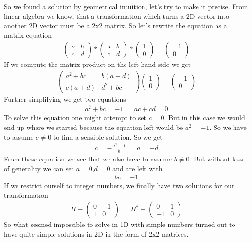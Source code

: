 So we found a solution by geometrical intuition, let's try to make it
precise. From linear algebra we know, that a transformation which turns
a 2D vector into another 2D vector must be a 2x2 matrix. So let's
rewrite the equation as a matrix equation 
\begin{align}
\begin{pmatrix} a & b \\ c & d \end{pmatrix} * \begin{pmatrix} a & b \\ c & d \end{pmatrix} * \begin{pmatrix} 1 \\ 0 \end{pmatrix} = \begin{pmatrix} -1 \\ 0 \end{pmatrix} 
\end{align} 
If we compute the matrix product on the left hand side we get 
\begin{align}
\begin{pmatrix} a^2 + bc & b (a+d) \\ c(a+d) & d^2 + bc \end{pmatrix} \begin{pmatrix} 1 \\ 0 \end{pmatrix} = \begin{pmatrix} -1 \\ 0 \end{pmatrix} 
\end{align} 
Further simplifying we get two equations 
\begin{align}
a^2+bc = -1 && ac + cd = 0
\end{align} 
To solve this equation one might attempt to set $c=0$. But in this
case we would end up where we started because the equation left would be
$a^2=-1$. So we have to assume $c \neq 0$ to find a sensible
solution. So we get 
\begin{align}
c = -\frac{a^2+1}{b} && a = -d
\end{align} 
From these equation we see that we also have to assume $b \neq 0$.
But without loss of generality we can set $a=0$,$d=0$ and are left
with 
\begin{align}
bc = -1
\end{align} 
If we restrict ourself to integer numbers, we finally have two
solutions for our transformation 
\begin{align}
B = \begin{pmatrix} 0 & -1 \\ 1 & 0 \end{pmatrix}  && B^* = \begin{pmatrix} 0 & 1 \\ -1 & 0 \end{pmatrix}
\end{align} 
So what seemed impossible to solve in 1D with simple numbers turned
out to have quite simple solutions in 2D in the form of 2x2 matrices.

